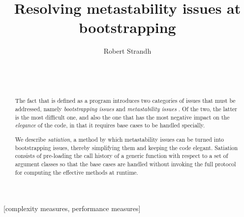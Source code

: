 \documentclass{acm_proc_article-sp}
\def\inputtex#1{}
\begin{document}
\title{Resolving metastability issues at bootstrapping}
\author{\alignauthor
Robert Strandh\\
\\
\\
\\
}

\maketitle

\begin{abstract}
The fact that \clos{} is defined as a \clos{} program introduces two
categories of issues that must be addressed, namely
\emph{bootstrapping issues} and \emph{metastability issues}
\cite{Kiczales:1991:AMP:574212}.  Of the two, the latter is the most
difficult one, and also the one that has the most negative impact on
the \emph{elegance} of the code, in that it requires base cases to be
handled specially.

We describe \emph{satiation}, a method by which metastability issues
can be turned into bootstrapping issues, thereby simplifying them and
keeping the code elegant.  Satiation consists of pre-loading the call
history of a generic function with respect to a set of argument
classes so that the base cases are handled without invoking the full
protocol for computing the effective methods at runtime. 
\end{abstract}

[complexity measures, performance measures]

\inputtex{sec-introduction.tex}
\inputtex{sec-previous.tex}
\inputtex{sec-our-method.tex}
\inputtex{sec-conclusions.tex}



\end{document}
